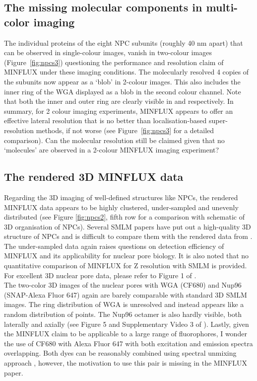 \documentclass[9pt,twocolumn,twoside]{pnas-new}
\begin{document}
\subsection{The missing molecular components in multi-color imaging}
The individual proteins of the eight NPC subunits (roughly 40 nm apart) that can be observed in single-colour images, vanish in two-colour images (Figure~\ref{fig:npcs3}) questioning the performance and resolution claim of MINFLUX  under these imaging conditions. The molecularly resolved 4 copies of the subunits now appear as a `blob' in 2-colour images. This also includes the inner ring of the WGA displayed as a blob in the second colour channel. Note that both the inner and outer ring are clearly visible in  \cite{loschberger2012super} and \cite{thevathasan2019nuclear} respectively. In summary, for 2 colour imaging experiments, MINFLUX appears to offer an effective lateral resolution that is no better than localisation-based super-resolution methods, if not worse (see Figure~\ref{fig:npcs3} for a detailed comparison). Can the molecular resolution still be claimed given that no `molecules' are observed in a 2-colour MINFLUX imaging experiment? 


\subsection{The rendered 3D MINFLUX data}

Regarding the 3D imaging of well-defined structures like NPCs, the rendered MINFLUX data appears to be highly clustered, under-sampled and unevenly distributed (see Figure \ref{fig:npcs2}, fifth row for a comparison with schematic of 3D organisation of NPCs). Several SMLM papers have put out a high-quality 3D structure of NPCs and is difficult to compare them with the rendered data from \cite{gwosch2020minflux}. The under-sampled data again raises questions on detection efficiency of MINFLUX and its applicability for nuclear pore biology. It is also noted that no quantitative comparison of MINFLUX for Z resolution with SMLM is provided. For excellent 3D nuclear pore data, please refer to Figure 1 of \cite{thevathasan2019nuclear}. \\
The two-color 3D images of the nuclear pores with WGA (CF680) and Nup96 (SNAP-Alexa Fluor 647) again are barely comparable with standard 3D SMLM images. The ring distribution of WGA is unresolved and instead appears like a random distribution of points. The Nup96 octamer is also hardly visible, both laterally and axially (see Figure 5 and Supplementary Video 3 of \cite{gwosch2020minflux}). Lastly, given the MINFLUX claim to be applicable to a large range of fluorophores, I wonder the use of CF680 with Alexa Fluor 647 with both excitation and emission spectra overlapping. Both dyes can be reasonably combined using spectral unmixing approach \citep{zhang2015ultrahigh}, however, the motivation to use this pair is missing in the MINFLUX paper. 
\end{document}

